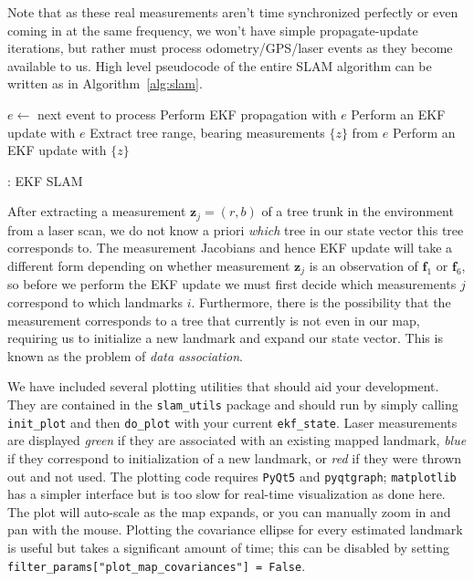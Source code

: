 \documentclass{article}
\newcommand{\mat}[1]{\bm{#1}}
\begin{document}
Note that as these real measurements aren't time synchronized perfectly or even coming in at the same frequency, we won't have simple propagate-update iterations, but rather must process odometry/GPS/laser events as they become available to us.
High level pseudocode of the entire SLAM algorithm can be written as in Algorithm~\ref{alg:slam}.
\begin{algorithm}[t]
{\small%
  \begin{algorithmic}[1]
    \State $e \leftarrow$ next event to process
      \State Perform EKF propagation with $e$
      \State Perform an EKF update with $e$
      \State Extract tree range, bearing measurements $\{z\}$ from $e$
      \State Perform an EKF update with $\{z\}$
    \EndIf
    \EndWhile
  \end{algorithmic}
}
\caption{: EKF SLAM}
\label{alg:slam}
\end{algorithm}

After extracting a measurement $\mat{z}_j = (r, b)$ of a tree trunk in the environment from a laser scan, we do not know a priori \emph{which} tree in our state vector this tree corresponds to.
The measurement Jacobians and hence EKF update will take a different form depending on whether measurement $\mat{z}_j$ is an observation of $\mat{f}_1$ or $\mat{f}_6$, so before we perform the EKF update we must first decide which measurements $j$ correspond to which landmarks $i$.
Furthermore, there is the possibility that the measurement corresponds to a tree that currently is not even in our map, requiring us to initialize a new landmark and expand our state vector.
This is known as the problem of \emph{data association}.

We have included several plotting utilities that should aid your development. 
They are contained in the \texttt{slam\_utils} package and should run by simply calling \texttt{init\_plot} and then \texttt{do\_plot} with your current \texttt{ekf\_state}.
Laser measurements are displayed \emph{green} if they are associated with an existing mapped landmark, \emph{blue} if they correspond to initialization of a new landmark, or \emph{red} if they were thrown out and not used. 
The plotting code requires \texttt{PyQt5} and \texttt{pyqtgraph}; \texttt{matplotlib} has a simpler interface but is too slow for real-time visualization as done here.
The plot will auto-scale as the map expands, or you can manually zoom in and pan with the mouse.
Plotting the covariance ellipse for every estimated landmark is useful but takes a significant amount of time; this can be disabled by setting \texttt{filter\_params["plot\_map\_covariances"] = False}.
\end{document}
